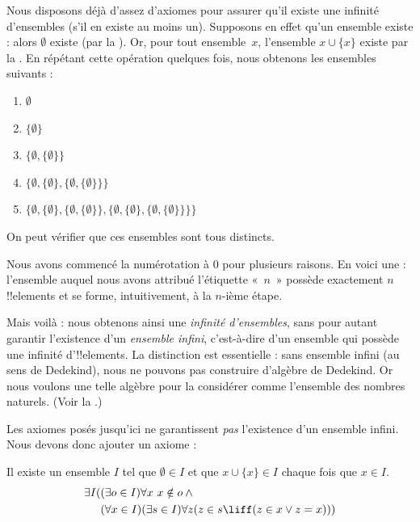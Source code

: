 \documentclass[../../../include/open-logic-section]{subfiles}
\begin{document}

Nous disposons déjà d'assez d'axiomes pour assurer qu'il existe une
infinité d'ensembles (s'il en existe au moins un). Supposons en effet
qu'un ensemble existe : alors $\emptyset$ existe (par la
). Or, pour tout ensemble~$x$,
l'ensemble $x \cup \{x\}$ existe par la
. En répétant cette
opération quelques fois, nous obtenons les ensembles suivants :
\begin{enumerate}
	\item[0.] $\emptyset$ %
	\item[1.] $ \{\emptyset\}$ %
	\item[2.] $\{\emptyset, \{\emptyset\}\}$ %
	\item[3.] $\{\emptyset, \{\emptyset\}, \{\emptyset, \{\emptyset\}\}\}$ %
	\item[4.] $\{\emptyset, \{\emptyset\}, \{\emptyset, \{\emptyset\}\}, \{\emptyset, \{\emptyset\}, \{\emptyset, \{\emptyset\}\}\}\}$%
\end{enumerate}
On peut vérifier que ces ensembles sont tous distincts.

Nous avons commencé la numérotation à $0$ pour plusieurs raisons.
En voici une : l'ensemble auquel nous avons attribué l'étiquette
«~$n$~» possède exactement $n$ !!{element}s et se forme,
intuitivement, à la $n$-ième étape.

Mais voilà : nous obtenons ainsi une \emph{infinité d'ensembles}, sans
pour autant garantir l'existence d'un \emph{ensemble infini}, c'est-à-dire
d'un ensemble qui possède une infinité d'!!{element}s. La distinction
est essentielle : sans ensemble infini (au sens de Dedekind), nous ne
pouvons pas construire d'algèbre de Dedekind. Or nous voulons une
telle algèbre pour la considérer comme l'ensemble des nombres naturels.
(Voir la .)

Les axiomes posés jusqu'ici ne garantissent \emph{pas} l'existence
d'un ensemble infini. Nous devons donc ajouter un axiome :

\begin{axiom}[Infini]
Il existe un ensemble $I$ tel que $\emptyset \in I$ et que
$x \cup \{x\} \in I$ chaque fois que $x \in I$.
\begin{align*}
	\exists I( & (\exists o \in I)\forall x\ x \notin o \land {}\\
	& (\forall x \in I)(\exists s \in I)\forall z(z \in s \liff (z \in x \lor z = x)))
\end{align*}
\end{axiom}
\end{document}
